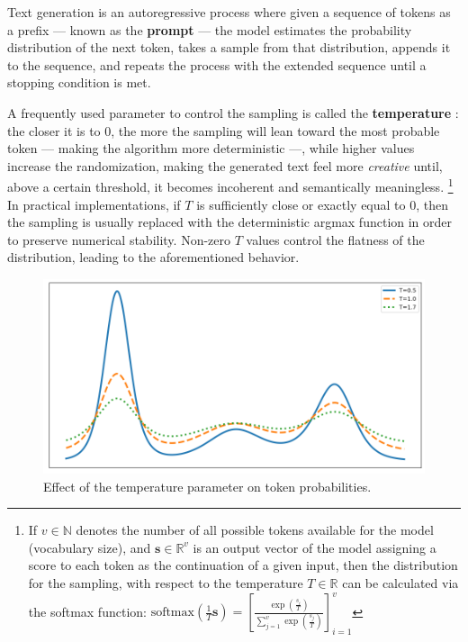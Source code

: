 \documentclass[noindent,nohyp,parspace,titlepage,twoside,12pt]{article}
\begin{document}
      Text generation is an autoregressive process where given a
      sequence of tokens as a prefix --- known as the \textbf{prompt} --- the
      model estimates the probability distribution of the next token, takes a
      sample from that distribution, appends it to the sequence, and repeats
      the process with the extended sequence until a stopping condition is met.

      A frequently used parameter to control the sampling is called the
      \textbf{temperature} \cite{temperature}: the closer it is to 0, the more
      the sampling will lean toward the most probable token --- making the
      algorithm more deterministic ---, while higher values increase the
      randomization, making the generated text feel more \emph{creative} until,
      above a certain threshold, it becomes incoherent and semantically
      meaningless. \footnote{If $v \in \mathbb{N}$ denotes the number of all
      possible tokens available for the model (vocabulary size), and
      $\mathbf{s} \in \mathbb{R}^v$ is an output vector of the model assigning
      a score to each token as the continuation of a given input, then the
      distribution for the sampling, with respect to the temperature $T \in
      \mathbb{R}$ can be calculated via the softmax function:
      $\text{softmax}\left(\frac{1}{T} \mathbf{s}\right) = \left[
      \frac{\exp(\frac{s_i}{T})}{\sum_{j=1}^v \exp(\frac{s_j}{T})}
      \right]_{i=1}^v$} In practical implementations, if $T$ is sufficiently
      close or exactly equal to $0$, then the sampling is usually replaced with
      the deterministic argmax function in order to preserve numerical
      stability.  Non-zero $T$ values control the flatness of the distribution,
      leading to the aforementioned behavior.

      \begin{figure}[hbtp]
        \label{figtemperature}
        \includegraphics[width=\textwidth]{softmax-temperature}
        \caption{Effect of the temperature parameter on token probabilities.}
      \end{figure}
\end{document}
